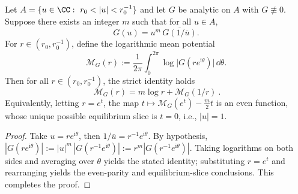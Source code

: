\begin{proposition}\label{prop:xi-selfdual-mean-potential-inversion}
Let \(A=\{u\in\CC:\ r_0<|u|<r_0^{-1}\}\) and let \(G\) be analytic on \(A\) with \(G\not\equiv 0\).
Suppose there exists an integer \(m\) such that for all \(u\in A\),
\[
G(u)=u^{m}\,\overline{G(1/\overline{u})}.
\]
For \(r\in(r_0,r_0^{-1})\), define the logarithmic mean potential
\[
\mathcal{M}_G(r):=\frac{1}{2\pi}\int_{0}^{2\pi}\log\bigl|G(re^{\mathrm{i}\theta})\bigr|\,\dd\theta.
\]
Then for all \(r\in(r_0,r_0^{-1})\), the strict identity holds
\[
\boxed{\ \mathcal{M}_G(r)=m\log r+\mathcal{M}_G(1/r)\ }.
\]
Equivalently, letting \(r=e^t\), the map \(t\mapsto \mathcal{M}_G(e^t)-\frac{m}{2}t\) is an even function, whose unique possible equilibrium slice is \(t=0\), i.e., \(|u|=1\).
\end{proposition}

\begin{proof}
Take \(u=re^{\mathrm{i}\theta}\), then \(1/\overline{u}=r^{-1}e^{\mathrm{i}\theta}\).
By hypothesis,
\(
|G(re^{\mathrm{i}\theta})|
:=|u|^{m}\,|G(r^{-1}e^{\mathrm{i}\theta})|
:=r^{m}|G(r^{-1}e^{\mathrm{i}\theta})|
\).
Taking logarithms on both sides and averaging over \(\theta\) yields the stated identity; substituting \(r=e^t\) and rearranging yields the even-parity and equilibrium-slice conclusions. This completes the proof.
\end{proof}

